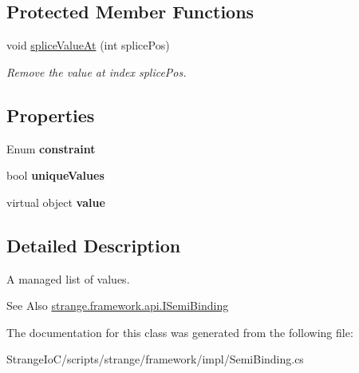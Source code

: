 \subsection*{Protected Member Functions}
\begin{DoxyCompactItemize}
\item 
\hypertarget{classstrange_1_1framework_1_1impl_1_1_semi_binding_a15a785ae9b34142bc49d0d6e8a04209a}{void \hyperlink{classstrange_1_1framework_1_1impl_1_1_semi_binding_a15a785ae9b34142bc49d0d6e8a04209a}{splice\-Value\-At} (int splice\-Pos)}\label{classstrange_1_1framework_1_1impl_1_1_semi_binding_a15a785ae9b34142bc49d0d6e8a04209a}

\begin{DoxyCompactList}\small\item\em Remove the value at index splice\-Pos. \end{DoxyCompactList}\end{DoxyCompactItemize}
\subsection*{Properties}
\begin{DoxyCompactItemize}
\item 
\hypertarget{classstrange_1_1framework_1_1impl_1_1_semi_binding_a0150494df4cb803713de14cc67383ca9}{Enum {\bfseries constraint}}\label{classstrange_1_1framework_1_1impl_1_1_semi_binding_a0150494df4cb803713de14cc67383ca9}

\item 
\hypertarget{classstrange_1_1framework_1_1impl_1_1_semi_binding_ab5115c4a789d11a90acf7c70e7146c4d}{bool {\bfseries unique\-Values}}\label{classstrange_1_1framework_1_1impl_1_1_semi_binding_ab5115c4a789d11a90acf7c70e7146c4d}

\item 
\hypertarget{classstrange_1_1framework_1_1impl_1_1_semi_binding_aae37109bd7acfcf56ecc95f0172a8b6a}{virtual object {\bfseries value}}\label{classstrange_1_1framework_1_1impl_1_1_semi_binding_aae37109bd7acfcf56ecc95f0172a8b6a}

\end{DoxyCompactItemize}


\subsection{Detailed Description}
A managed list of values. 

\begin{DoxySeeAlso}{See Also}
\hyperlink{interfacestrange_1_1framework_1_1api_1_1_i_semi_binding}{strange.\-framework.\-api.\-I\-Semi\-Binding} 
\end{DoxySeeAlso}


The documentation for this class was generated from the following file\-:\begin{DoxyCompactItemize}
\item 
Strange\-Io\-C/scripts/strange/framework/impl/Semi\-Binding.\-cs\end{DoxyCompactItemize}
